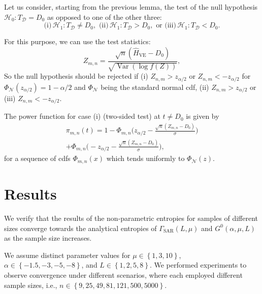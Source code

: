\documentclass[conference]{IEEEtran}
\begin{document}
Let us consider, starting from the previous lemma, the test of the null hypothesis $\mathcal{H}_0: T_{\mathcal{D}}=D_0$ as opposed to one of the other three:
$$
\text{(i)}\, \mathcal{H}_1:T_{\mathcal{D}}\neq D_0, \, \, \text{(ii)}\, \mathcal{H}_1:T_{\mathcal{D}}> D_0, \, \, \text{or}\, \,  \text{(iii)}\, \mathcal{H}_1:T_{\mathcal{D}}< D_0. 
$$


For this purpose, we can use the test statistics:
$$
Z_{m,n} = \frac{\sqrt{n}(\widehat{H}_{\text{VE}}-D_0)}{\sqrt{\operatorname{Var}(\log f(Z))}},
$$
So the null hypothesis should be rejected if (i) $Z_{n,m} > z_{\alpha/2}$ or $Z_{n,m} < - z_{\alpha/2}$ for $\Phi_{\mathcal N}(z_{\alpha/2})=1-\alpha/2$ and $\Phi_{\mathcal N}$ being the standard normal cdf, (ii) $Z_{n,m} > z_{\alpha/2}$ or (iii) $Z_{n,m} < - z_{\alpha/2}$.  

The power function for case (i) (two-sided test) at $t\neq D_0$ is given by
\begin{multline*}
\pi_{m,n}(t)=1-\Phi_{m,n}\Big(z_{\alpha/2}-\frac{\sqrt{n}(Z_{m,n}-D_0)}{\sigma}\Big)\\+\Phi_{m,n}\Big(-z_{\alpha/2}-\frac{\sqrt{n}(Z_{m,n}-D_0)}{\sigma}\Big),
\end{multline*}
for a sequence of cdfs $\Phi_{m,n}(x)$ which tends uniformly to $\Phi_{\mathcal N}(z)$.

\section{Results}

We verify that the results of the non-parametric entropies for samples of different sizes converge towards the analytical entropies of $\Gamma_{\text{SAR}}(L, \mu)$ and $G^0(\alpha, \mu , L)$ as the sample size increases. 

We assume distinct parameter values for $\mu \in \left\{1, 3, 10\right\}$,  $\alpha\in\left\{-1.5,-3,-5, -8\right\}$, and  $L \in\left\{1,2, 5, 8\right\}$.
We performed experiments to observe convergence under different scenarios, where each employed different sample sizes, i.e., $n\in \left\{9, 25, 49, 81, 121, 500, 5000\right\}$. 
\end{document}

